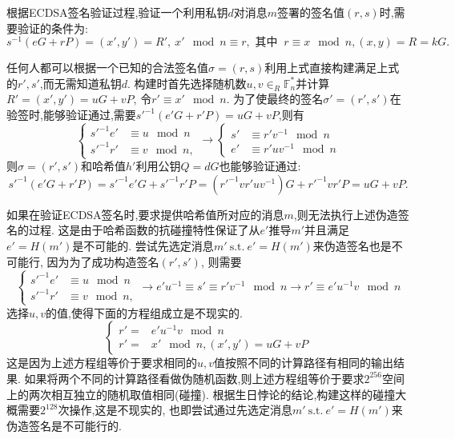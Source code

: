 \documentclass{article}
\newcommand{\F}{\mathbb{F}}
\begin{document}
根据ECDSA签名验证过程,验证一个利用私钥$d$对消息$m$签署的签名值$(r,s)$时,需要验证的条件为:
$$s^{-1}(eG+rP) = (x', y') = R', \  x' \mod n \equiv r, \text{ 其中 }\  r \equiv x \mod n, (x,y) = R = kG.$$

任何人都可以根据一个已知的合法签名值$\sigma=(r,s)$利用上式直接构建满足上式的$r', s'$,而无需知道私钥$d$.
构建时首先选择随机数$u, v\in_R\F_n^*$并计算$R' = (x', y') = uG + vP$, 令$r' \equiv x' \mod n$.
为了使最终的签名$\sigma' = (r', s')$在验签时,能够验证通过,需要$s'^{-1}(e'G  + r'P) = uG + vP$,则有
\begin{equation}\nonumber
\left\{
\begin{array}{ll}
s'^{-1}e' & \equiv u \mod n\\
s'^{-1}r' & \equiv v \mod n,
\end{array}
\right.
\rightarrow
\left\{
\begin{array}{ll}
s' & \equiv r'v^{-1} \mod n\\
e' & \equiv r'uv^{-1} \mod n
\end{array}
\right.
\end{equation}
则$\sigma = (r', s')$和哈希值$h'$利用公钥$Q=dG$也能够验证通过:
$$
s'^{-1}(e'G + r'P) = s'^{-1}e' G + s'^{-1}r'P = (r'^{-1}v r'uv^{-1})G + r'^{-1}vr' P  = uG + vP.
$$

如果在验证ECDSA签名时,要求提供哈希值所对应的消息$m$,则无法执行上述伪造签名的过程.
这是由于哈希函数的抗碰撞特性保证了从$e'$推导$m'$并且满足$e'=H(m')$是不可能的.
尝试先选定消息$m'\ \text{s.t.}\ e' = H(m')$来伪造签名也是不可能行, 因为为了成功构造签名$(r', s')$, 则需要
\begin{equation}\nonumber
\left\{
\begin{array}{ll}
s'^{-1}e' & \equiv u \mod n\\
s'^{-1}r' & \equiv v \mod n,
\end{array}
\right.
\rightarrow
e'u^{-1} \equiv s' \equiv r'v^{-1} \mod n
\rightarrow
r' \equiv e'u^{-1}v \mod n
\end{equation}
选择$u,v$的值,使得下面的方程组成立是不现实的.
\begin{equation}\nonumber
\left\{
\begin{array}{ll}
r' = & e'u^{-1}v \mod n\\
r ' = & x' \mod n,  (x', y') = uG + vP
\end{array}
\right.
\end{equation}
这是因为上述方程组等价于要求相同的$u,v$值按照不同的计算路径有相同的输出结果.
如果将两个不同的计算路径看做伪随机函数,则上述方程组等价于要求$2^{256}$空间上的两次相互独立的随机取值相同(碰撞).
根据生日悖论的结论,构建这样的碰撞大概需要$2^{128}$次操作,这是不现实的,
也即尝试通过先选定消息$m'\ \text{s.t.}\ e' = H(m')$来伪造签名是不可能行的.
\end{document}
